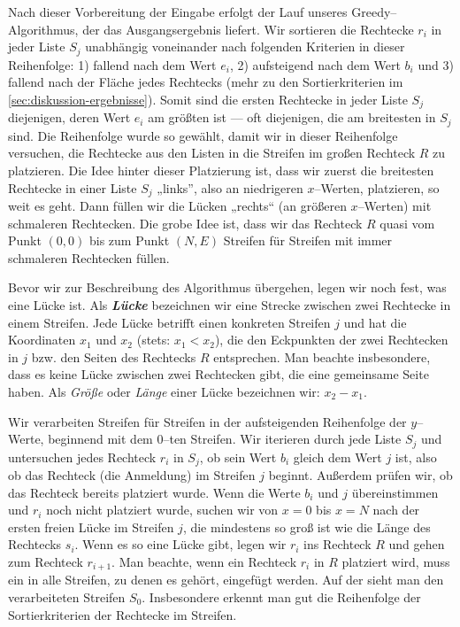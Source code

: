 Nach dieser Vorbereitung der Eingabe erfolgt der Lauf unseres Greedy--Algorithmus, der das
Ausgangsergebnis liefert.
Wir sortieren die Rechtecke $r_i$ in jeder Liste $S_j$ unabhängig voneinander nach folgenden Kriterien
in dieser Reihenfolge: 
1) fallend nach dem Wert $e_i$,
2) aufsteigend nach dem Wert $b_i$ und
3) fallend nach der Fläche jedes Rechtecks
(mehr zu den Sortierkriterien im \cref{sec:diskussion-ergebnisse}).
Somit sind die ersten Rechtecke in jeder Liste $S_j$ diejenigen,
deren Wert $e_i$ am größten ist --- oft diejenigen, die am breitesten in $S_j$ sind.
Die Reihenfolge wurde so gewählt, damit wir in dieser Reihenfolge versuchen,
die Rechtecke aus den Listen in die Streifen im großen Rechteck $R$ zu platzieren.
Die Idee hinter dieser Platzierung ist, dass wir zuerst die breitesten Rechtecke in einer Liste $S_j$
„links”, also an niedrigeren $x$--Werten, platzieren, so weit es geht. Dann füllen wir 
die Lücken „rechts“ (an größeren $x$--Werten) mit schmaleren Rechtecken. 
Die grobe Idee ist, dass wir das Rechteck $R$ quasi vom Punkt $(0,0)$ bis zum Punkt
$(N, E)$ Streifen für Streifen mit immer schmaleren Rechtecken füllen.



Bevor wir zur Beschreibung des Algorithmus übergehen, legen wir noch fest, was
eine Lücke ist. Als \textbf{\textit{Lücke}} bezeichnen wir eine Strecke 
zwischen zwei Rechtecke in einem Streifen. Jede Lücke betrifft einen
konkreten Streifen $j$ und hat die Koordinaten $x_1$ und $x_2$ (stets: $x_1 < x_2$),
die den Eckpunkten der zwei Rechtecken in $j$ bzw. den Seiten des Rechtecks $R$ entsprechen.
Man beachte insbesondere, dass es keine Lücke zwischen zwei Rechtecken gibt,
die eine gemeinsame Seite haben.
Als \textit{Größe} oder \textit{Länge} einer Lücke bezeichnen wir: $x_2 - x_1$.

Wir verarbeiten Streifen für Streifen in der
aufsteigenden Reihenfolge der $y$--Werte, beginnend mit dem 0--ten Streifen.
Wir iterieren durch jede Liste $S_j$ und untersuchen jedes Rechteck $r_i$ in $S_j$, ob sein Wert $b_i$ gleich dem Wert $j$ ist, also ob das Rechteck (die Anmeldung) im Streifen $j$ beginnt.
Außerdem prüfen wir, ob das Rechteck bereits platziert wurde.
Wenn die Werte $b_i$ und $j$ übereinstimmen und $r_i$ noch nicht platziert wurde, 
suchen wir von $x = 0$ bis $x = N$ nach der ersten freien Lücke im Streifen $j$,
die mindestens so groß ist wie die Länge des Rechtecks $s_i$. 
Wenn es so eine Lücke gibt, legen wir $r_i$ ins Rechteck $R$ und gehen zum Rechteck $r_{i+1}$.
Man beachte, wenn ein Rechteck $r_i$ in $R$ platziert wird, muss ein in alle Streifen,
zu denen es gehört, eingefügt werden.
Auf der  sieht man den verarbeiteten Streifen $S_0$.
Insbesondere erkennt man gut die Reihenfolge der Sortierkriterien der Rechtecke
im Streifen.

